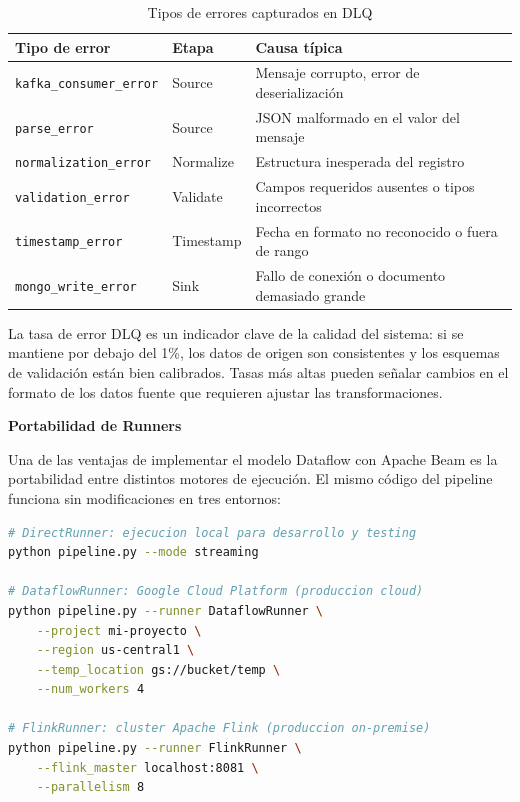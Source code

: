 \documentclass[12pt,a4paper]{article}
\begin{document}
\begin{table}[H]
    \centering
    \caption{Tipos de errores capturados en DLQ}
    \begin{tabular}{@{}llp{7cm}@{}}
        \toprule
        \textbf{Tipo de error}          & \textbf{Etapa} & \textbf{Causa típica}                           \\
        \midrule
        \texttt{kafka\_consumer\_error} & Source         & Mensaje corrupto, error de deserialización      \\
        \texttt{parse\_error}           & Source         & JSON malformado en el valor del mensaje         \\
        \texttt{normalization\_error}   & Normalize      & Estructura inesperada del registro              \\
        \texttt{validation\_error}      & Validate       & Campos requeridos ausentes o tipos incorrectos  \\
        \texttt{timestamp\_error}       & Timestamp      & Fecha en formato no reconocido o fuera de rango \\
        \texttt{mongo\_write\_error}    & Sink           & Fallo de conexión o documento demasiado grande  \\
        \bottomrule
    \end{tabular}
\end{table}

La tasa de error DLQ es un indicador clave de la calidad del sistema: si se mantiene por debajo del 1\%, los datos de origen son consistentes y los esquemas de validación están bien calibrados. Tasas más altas pueden señalar cambios en el formato de los datos fuente que requieren ajustar las transformaciones.

\textbf{Portabilidad de Runners}

Una de las ventajas de implementar el modelo Dataflow con Apache Beam es la portabilidad entre distintos motores de ejecución. El mismo código del pipeline funciona sin modificaciones en tres entornos:

\begin{lstlisting}[language=bash, caption=Ejecución en diferentes runners]
# DirectRunner: ejecucion local para desarrollo y testing
python pipeline.py --mode streaming

# DataflowRunner: Google Cloud Platform (produccion cloud)
python pipeline.py --runner DataflowRunner \
    --project mi-proyecto \
    --region us-central1 \
    --temp_location gs://bucket/temp \
    --num_workers 4

# FlinkRunner: cluster Apache Flink (produccion on-premise)
python pipeline.py --runner FlinkRunner \
    --flink_master localhost:8081 \
    --parallelism 8
\end{lstlisting}
\end{document}
